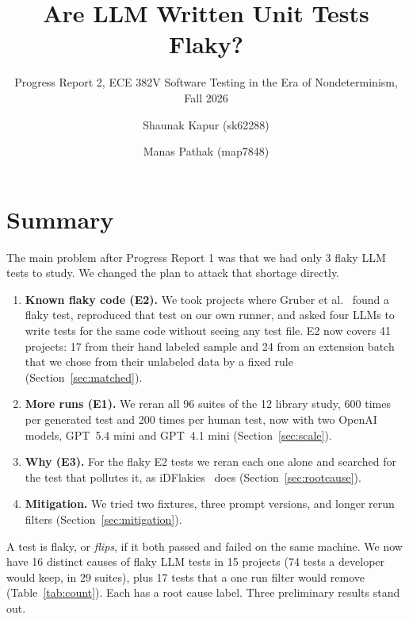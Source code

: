 \documentclass[sigconf,nonacm]{acmart}
\begin{document}
\sloppy

\title{Are LLM Written Unit Tests Flaky?}
\subtitle{Progress Report 2, ECE 382V Software Testing in the Era of Nondeterminism, Fall 2026}
\author{Shaunak Kapur (sk62288)}
\author{Manas Pathak (map7848)}
\maketitle

\section{Summary}
The main problem after Progress Report 1 was that we had only 3 flaky LLM tests to study. We changed the plan to attack that shortage directly.
\begin{enumerate}
\item \textbf{Known flaky code (E2).} We took projects where Gruber et al.~\cite{gruber2021} found a flaky test, reproduced that test on our own runner, and asked four LLMs to write tests for the same code without seeing any test file. E2 now covers 41 projects: 17 from their hand labeled sample and 24 from an extension batch that we chose from their unlabeled data by a fixed rule (Section~\ref{sec:matched}).
\item \textbf{More runs (E1).} We reran all 96 suites of the 12 library study, 600 times per generated test and 200 times per human test, now with two OpenAI models, GPT~5.4 mini and GPT~4.1 mini (Section~\ref{sec:scale}).
\item \textbf{Why (E3).} For the flaky E2 tests we reran each one alone and searched for the test that pollutes it, as iDFlakies~\cite{lam2019} does (Section~\ref{sec:rootcause}).
\item \textbf{Mitigation.} We tried two fixtures, three prompt versions, and longer rerun filters (Section~\ref{sec:mitigation}).
\end{enumerate}
A test is flaky, or \emph{flips}, if it both passed and failed on the same machine. We now have 16 distinct causes of flaky LLM tests in 15 projects (74 tests a developer would keep, in 29 suites), plus 17 tests that a one run filter would remove (Table~\ref{tab:count}). Each has a root cause label. Three preliminary results stand out.
\end{document}
